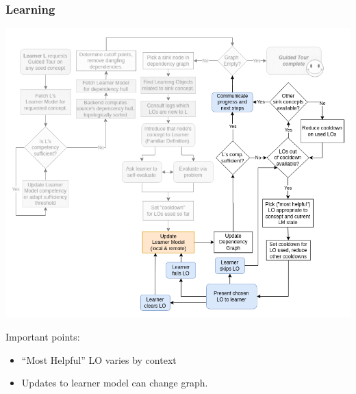 \documentclass[aspectratio=169, usenames, dvipsnames]{beamer}
\begin{document}
\begin{frame}
\frametitle{Learning}
\begin{minipage}{0.7\textwidth}
\vspace*{-10px}
\includegraphics[height=0.9\textheight,keepaspectratio]{images/gt_algorithm_square_step3}
\end{minipage}%
\begin{minipage}{0.3\textwidth}
Important points:
\bigskip
\begin{itemize}
\item ``Most Helpful'' LO varies by context\\
\item Updates to learner model can change graph.
\end{itemize}
\end{minipage}%
\end{frame}
\end{document}
